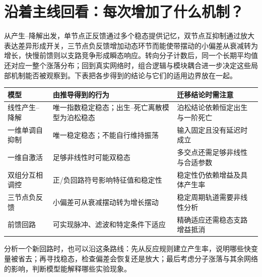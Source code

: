 \documentclass[11pt,a4paper,UTF8,fontset=fandol]{ctexart}
\begin{document}
\section{沿着主线回看：每次增加了什么机制？}
从产生--降解出发，单节点正反馈通过多个稳态提供记忆，双节点互抑制通过放大表达差异形成开关，三节点负反馈增加动态环节而能使带摆动的小偏差从衰减转为增长，快慢前馈则以支路竞争形成瞬态响应。转向分子计数后，同一个长期平均值还对应一整个涨落分布；回到真实网络时，组合逻辑与模块耦合进一步决定这些局部机制能否被观察到。下表把各步得到的结论与它们的适用边界放在一起。
\begin{center}\begin{tabular}{>{\raggedright\arraybackslash}p{3.1cm}>{\raggedright\arraybackslash}p{6cm}>{\raggedright\arraybackslash}p{5.6cm}}\toprule
模型 & 由推导得到的行为 & 迁移结论时需注意\\\midrule
线性产生--降解 & 唯一指数稳定稳态；出生--死亡离散模型为泊松稳态 & 泊松结论依赖恒定出生与一阶死亡\\
一维单调自抑制 & 唯一稳定稳态；不能自行维持振荡 & 输入固定且没有延迟时成立\\
一维自激活 & 足够非线性时可能双稳态 & 多交点还需足够非线性与合适参数\\
双组分互相调控 & 正/负回路符号影响特征值和稳定性 & 稳定性仍依赖增益及具体产生率\\
三节点负反馈 & 小偏差可从衰减摆动转为增长摆动 & 稳定周期轨道需要非线性分析\\
前馈回路 & 可实现脉冲、滤波和特定条件下适应 & 精确适应还需稳态支路增益抵消\\
\bottomrule\end{tabular}\end{center}

分析一个新回路时，也可以沿这条路线：先从反应规则建立产生率，说明哪些快变量被省去；再寻找稳态，检查偏差会恢复还是放大；最后考虑分子涨落与其余网络的影响，判断模型能解释哪些实验现象。
\end{document}
